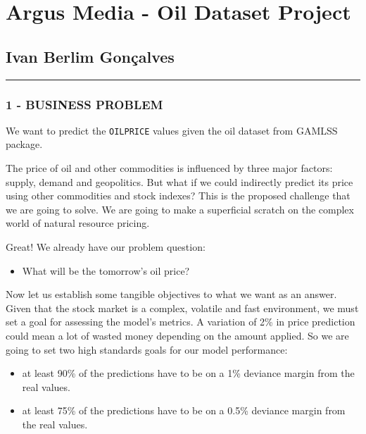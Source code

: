 \documentclass[
]{article}
\author{}
\date{\vspace{-2.5em}}
\providecommand{\tightlist}{%
  \setlength{\itemsep}{0pt}\setlength{\parskip}{0pt}}
\begin{document}
\hypertarget{argus-media---oil-dataset-project}{%
\section{Argus Media - Oil Dataset
Project}\label{argus-media---oil-dataset-project}}

\hypertarget{ivan-berlim-gonuxe7alves}{%
\subsection{Ivan Berlim Gonçalves}\label{ivan-berlim-gonuxe7alves}}

\begin{center}\rule{0.5\linewidth}{0.5pt}\end{center}

\hypertarget{business-problem}{%
\subsubsection{1 - BUSINESS PROBLEM}\label{business-problem}}

We want to predict the \texttt{OILPRICE} values given the oil dataset
from GAMLSS package.

The price of oil and other commodities is influenced by three major
factors: supply, demand and geopolitics. But what if we could indirectly
predict its price using other commodities and stock indexes? This is the
proposed challenge that we are going to solve. We are going to make a
superficial scratch on the complex world of natural resource pricing.

Great! We already have our problem question:

\begin{itemize}
\tightlist
\item
  What will be the tomorrow's oil price?
\end{itemize}

Now let us establish some tangible objectives to what we want as an
answer. Given that the stock market is a complex, volatile and fast
environment, we must set a goal for assessing the model's metrics. A
variation of 2\% in price prediction could mean a lot of wasted money
depending on the amount applied. So we are going to set two high
standards goals for our model performance:

\begin{itemize}
\tightlist
\item
  at least 90\% of the predictions have to be on a 1\% deviance margin
  from the real values.
\item
  at least 75\% of the predictions have to be on a 0.5\% deviance margin
  from the real values.
\end{itemize}
\end{document}
